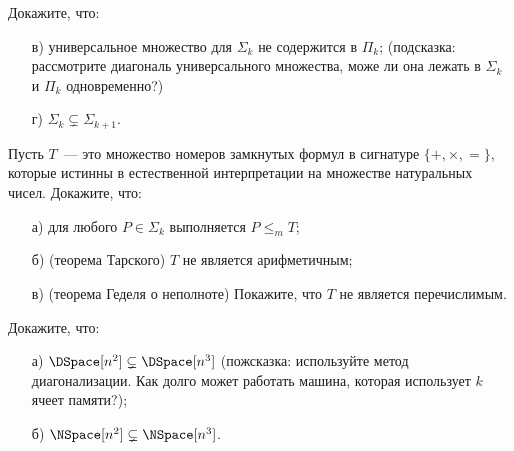 \begin{ptask}{29}
    Докажите, что:
    \begin{enumerate}[topsep = 0pt, itemsep = -1ex]
        \item [в)] универсальное множество для $\Sigma_k$ не содержится в $\Pi_k$; (подсказка: рассмотрите диагональ универсального
		    множества, може ли она лежать в $\Sigma_k$ и $\Pi_k$ одновременно?)
        \item [г)] $\Sigma_k \subsetneq \Sigma_{k + 1}$.
    \end{enumerate}
\end{ptask}


\begin{ptask}{30}
	Пусть $T$~--- это множество номеров замкнутых формул в сигнатуре $\{+, \times, {=\}}$, которые истинны в естественной
    интерпретации на множестве натуральных чисел. Докажите, что:
    \begin{enumerate}[topsep = 0pt, itemsep = -1ex]
        \item [а)] для любого $P \in \Sigma_k$ выполняется $P \le_m T$;
        \item [б)] (теорема Тарского) $T$ не является арифметичным;
        \item [в)] (теорема Геделя о неполноте) Покажите, что $T$ не является перечислимым.
    \end{enumerate}
\end{ptask}


\begin{ptask}{31}
	Докажите, что:
    \begin{enumerate}[topsep = 0pt, itemsep = -1ex]
		\item [а)] $\DSpace[n^2] \subsetneq \DSpace[n^3]$ (пожсказка: используйте метод диагонализации. Как долго может работать
		    машина, которая использует $k$ ячеет памяти?);
        \item [б)] $\NSpace[n^2] \subsetneq \NSpace[n^3]$.
    \end{enumerate}
\end{ptask}